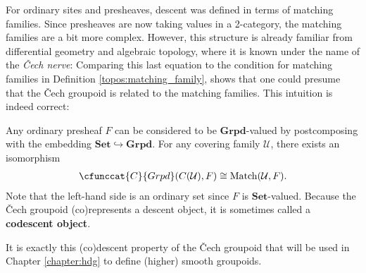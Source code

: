     For ordinary sites and presheaves, descent was defined in terms of matching families. Since presheaves are now taking values in a 2-category, the matching families are a bit more complex. However, this structure is already familiar from differential geometry and algebraic topology, where it is known under the name of the \textit{\v{C}ech nerve}:
    Comparing this last equation to the condition for matching families in Definition \ref{topos:matching_family}, shows that one could presume that the \v{C}ech groupoid is related to the matching families. This intuition is indeed correct:
    \begin{property}\label{topos:cech_matching_families}
        Any ordinary presheaf $F$ can be considered to be $\mathbf{Grpd}$-valued by postcomposing with the embedding $\mathbf{Set}\hookrightarrow\mathbf{Grpd}$. For any covering family $\mathcal{U}$, there exists an isomorphism
        \begin{gather}
            \cfunccat{C}{Grpd}(C(\mathcal{U}),F)\cong\mathrm{Match}(\mathcal{U},F).
        \end{gather}
        Note that the left-hand side is an ordinary set since $F$ is $\mathbf{Set}$-valued. Because the \v{C}ech groupoid (co)represents a descent object, it is sometimes called a \textbf{codescent object}.
    \end{property}
    It is exactly this (co)descent property of the \v{C}ech groupoid that will be used in Chapter \ref{chapter:hdg} to define (higher) smooth groupoids.

